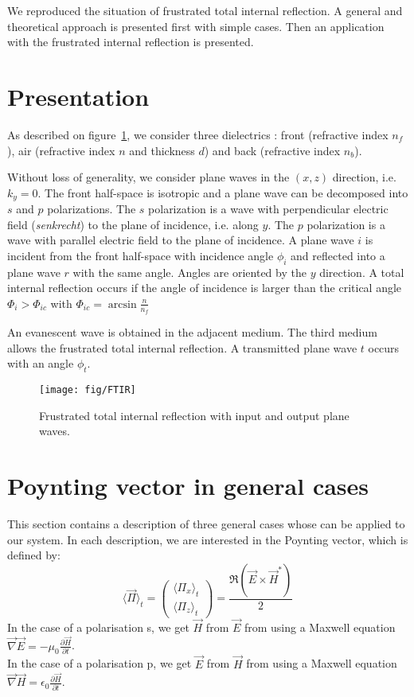 


We reproduced the situation of frustrated total internal reflection. A general and theoretical approach is presented first with simple cases. Then an application with the frustrated internal reflection is presented.


\section{Presentation}

As described on figure~\ref{fig:FTIR}, we consider three dielectrics : front (refractive index $n_f$), air (refractive index $n$ and thickness $d$) and back (refractive index $n_b$).

Without loss of generality, we consider plane waves in the $(x,z)$ direction, i.e. $k_y=0$. The front half-space is isotropic and a plane wave can be decomposed into $s$ and $p$ polarizations.
The $s$ polarization is a wave with perpendicular electric field (\emph{senkrecht}) to the plane of incidence, i.e. along $y$.
The $p$ polarization is a wave with parallel electric field to the plane of incidence.
A plane wave $i$ is incident from the front half-space with incidence angle $\phi_i$ and reflected into a plane wave $r$ with the same angle. Angles are oriented by the $y$ direction. 
A total internal reflection occurs if the angle of incidence is larger than the critical angle
$\Phi_i > \Phi_{ic}$ with $\Phi_{ic}=\arcsin\displaystyle\frac{n}{n_f}$

An evanescent wave is obtained in the adjacent medium. The third medium allows the frustrated total internal reflection. A transmitted plane wave $t$ occurs with an angle $\phi_t$.

\begin{figure}[!h]
\texttt{[image: fig/FTIR]}
\caption{\label{fig:FTIR}Frustrated total internal reflection with input and output plane waves. }
\end{figure}

\section{Poynting vector in general cases}
This section contains a description of three general cases whose can be applied to our system. In each description, we are interested in the Poynting vector, which is defined by:
$$\langle \vec{\Pi} \rangle _t = \begin{pmatrix}
\langle \Pi _x \rangle _t\\
\langle \Pi _z \rangle _t
\end{pmatrix}
=\frac{\Re(\vec{E}\times \vec{H}^*)}{2} $$
In the case of a polarisation s, we get $\vec{H}$ from $\vec{E}$ from using a Maxwell equation
$\vec{\nabla}\vec{E} = -\mu_0 \frac{\partial\vec{H}}{\partial t}$.\\
In the case of a polarisation p, we get $\vec{E}$ from $\vec{H}$ from using a Maxwell equation $\vec{\nabla}\vec{H}=\epsilon_0\frac{\partial\vec{H}}{\partial t}$.\\


